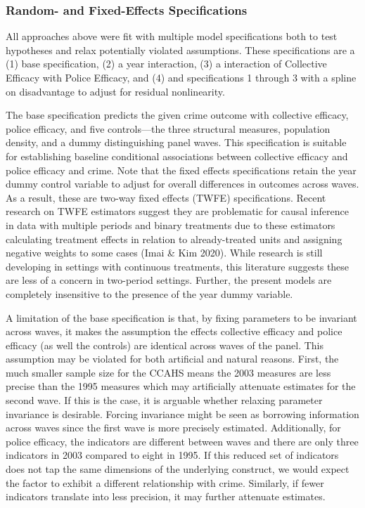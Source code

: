 \documentclass [11pt, proquest] {uwthesis}[2015/03/03]
\begin{document}
\hypertarget{random--and-fixed-effects-specifications}{%
\subsubsection{Random- and Fixed-Effects Specifications}\label{random--and-fixed-effects-specifications}}

All approaches above were fit with multiple model specifications both to test hypotheses and relax potentially violated assumptions. These specifications are a (1) base specification, (2) a year interaction, (3) a interaction of Collective Efficacy with Police Efficacy, and (4) and specifications 1 through 3 with a spline on disadvantage to adjust for residual nonlinearity.

The base specification predicts the given crime outcome with collective efficacy, police efficacy, and five controls---the three structural measures, population density, and a dummy distinguishing panel waves. This specification is suitable for establishing baseline conditional associations between collective efficacy and police efficacy and crime. Note that the fixed effects specifications retain the year dummy control variable to adjust for overall differences in outcomes across waves. As a result, these are two-way fixed effects (TWFE) specifications. Recent research on TWFE estimators suggest they are problematic for causal inference in data with multiple periods and binary treatments due to these estimators calculating treatment effects in relation to already-treated units and assigning negative weights to some cases (Imai \& Kim 2020). While research is still developing in settings with continuous treatments, this literature suggests these are less of a concern in two-period settings. Further, the present models are completely insensitive to the presence of the year dummy variable.

A limitation of the base specification is that, by fixing parameters to be invariant across waves, it makes the assumption the effects collective efficacy and police efficacy (as well the controls) are identical across waves of the panel. This assumption may be violated for both artificial and natural reasons. First, the much smaller sample size for the CCAHS means the 2003 measures are less precise than the 1995 measures which may artificially attenuate estimates for the second wave. If this is the case, it is arguable whether relaxing parameter invariance is desirable. Forcing invariance might be seen as borrowing information across waves since the first wave is more precisely estimated. Additionally, for police efficacy, the indicators are different between waves and there are only three indicators in 2003 compared to eight in 1995. If this reduced set of indicators does not tap the same dimensions of the underlying construct, we would expect the factor to exhibit a different relationship with crime. Similarly, if fewer indicators translate into less precision, it may further attenuate estimates.
\end{document}
